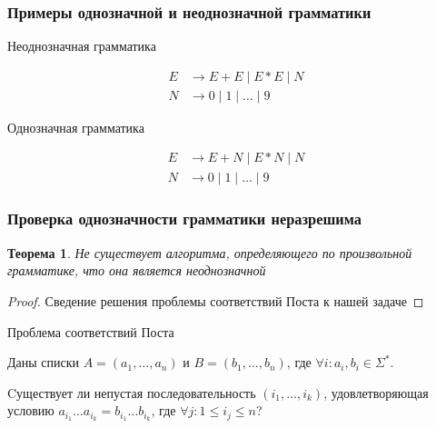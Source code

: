\documentclass{beamer}
\newtheorem{rutheorem}{Теорема}
\begin{document}
\begin{frame}[fragile]
  \transwipe[direction=90]
  \frametitle{Примеры однозначной и неоднозначной грамматики}
  
\begin{center}
  Неоднозначная грамматика
\end{center}

\vspace{-0.8cm}

  \begin{align*}
    E &\to E + E \mid E * E \mid N \\
    N &\to 0 \mid 1  \mid \dots \mid 9
  \end{align*}

\vfill

\begin{center}
  Однозначная грамматика
\end{center}

\vspace{-0.8cm}

  \begin{align*}
    E &\to E + N \mid E * N \mid N \\
    N &\to 0 \mid 1  \mid \dots \mid 9
  \end{align*}  
\end{frame}

\begin{frame}[fragile]
  \transwipe[direction=90]
  \frametitle{Проверка однозначности грамматики неразрешима}

\begin{rutheorem}
  Не существует алгоритма, определяющего по произвольной грамматике, что она является неоднозначной
\end{rutheorem}

\begin{proof}
  Сведение решения проблемы соответствий Поста к нашей задаче
\end{proof}


\vfill

\begin{center}
  Проблема соответствий Поста
\end{center}

 Даны списки $A = (a_1, \dots, a_n)$ и $B = (b_1 ,\dots ,b_n)$, где $\forall i: a_i, b_i \in \Sigma ^*$. 
 
 Cуществует ли непустая последовательность $(i_1 , \dots, i_k)$, удовлетворяющая условию $a_{i_1} \dots a_{i_k} = b_{i_1} \dots b_{i_k}$, где $\forall j: 1 \leq i_j \leq n$?

\end{frame}
\end{document}
